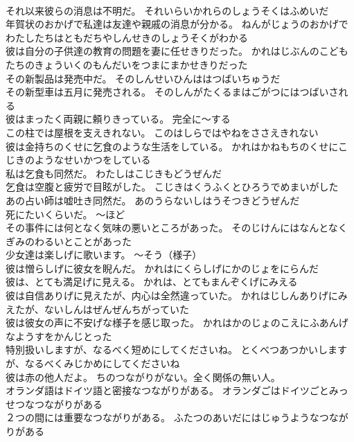 \documentclass[8pt]{extreport}
\begin{document}
\begin{CJK}{UTF8}{min}
\\	それ以来彼らの消息は不明だ。	それいらいかれらのしょうそくはふめいだ 
\\	年賀状のおかげで私達は友達や親戚の消息が分かる。	ねんがじょうのおかげでわたしたちはともだちやしんせきのしょうそくがわかる 
\\	彼は自分の子供達の教育の問題を妻に任せきりだった。	かれはじぶんのこどもたちのきょういくのもんだいをつまにまかせきりだった 
\\	その新製品は発売中だ。	そのしんせいひんははつばいちゅうだ 
\\	その新型車は五月に発売される。	そのしんがたくるまはごがつにはつばいされる 
\\	彼はまったく両親に頼りきっている。	完全に～する
\\	この柱では屋根を支えきれない。	このはしらではやねをささえきれない 
\\	彼は金持ちのくせに乞食のような生活をしている。	かれはかねもちのくせにこじきのようなせいかつをしている 
\\	私は乞食も同然だ。	わたしはこじきもどうぜんだ 
\\	乞食は空腹と疲労で目眩がした。	こじきはくうふくとひろうでめまいがした 
\\	あの占い師は嘘吐き同然だ。	あのうらないしはうそつきどうぜんだ 
\\	死にたいくらいだ。	～ほど
\\	その事件には何となく気味の悪いところがあった。	そのじけんにはなんとなくぎみのわるいとことがあった 
\\	少女達は楽しげに歌います。	～そう（様子）
\\	彼は憎らしげに彼女を睨んだ。	かれはにくらしげにかのじょをにらんだ 
\\	彼は、とても満足げに見える。	かれは、とてもまんぞくげにみえる 
\\	彼は自信ありげに見えたが、内心は全然違っていた。	かれはじしんありげにみえたが、ないしんはぜんぜんちがっていた 
\\	彼は彼女の声に不安げな様子を感じ取った。	かれはかのじょのこえにふあんげなようすをかんじとった 
\\	特別扱いしますが、なるべく短めにしてくださいね。	とくべつあつかいしますが、なるべくみじかめにしてくださいね 
\\	彼は赤の他人だよ。	ちのつながりがない。全く関係の無い人。
\\	オランダ語はドイツ語と密接なつながりがある。	オランダごはドイツごとみっせつなつながりがある 
\\	２つの間には重要なつながりがある。	ふたつのあいだにはじゅうようなつながりがある 

\end{CJK}
\end{document}
